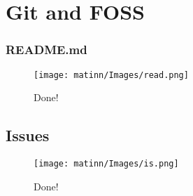 \documentclass[12pt]{article}
\begin{document}
\section{Git and FOSS}

\subsubsection{README.md}
\begin{figure}

  \centering

\texttt{[image: matinn/Images/read.png]}

\caption{Done!}


\end{figure}

\subsection{Issues}
\begin{figure}

  \centering

\texttt{[image: matinn/Images/is.png]}

\caption{Done!}


\end{figure}
\end{document}
